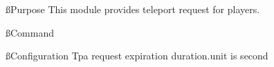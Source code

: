 
\ss{Purpose}
This module provides teleport request for players.

\ss{Command}


\ss{Configuration}
Tpa request expiration duration.unit is second

